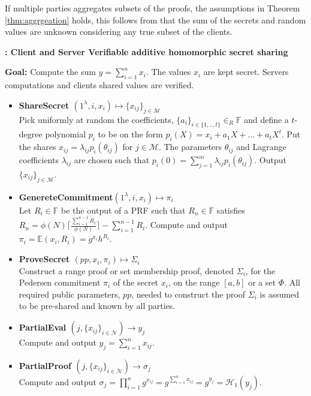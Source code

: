 If multiple parties aggregates subsets of the proofs, the assumptions in Theorem \ref{thm:aggrgeation} holds,  this follows from that the sum of the secrets and random values are unknown considering any true subset of the clients. 

\begin{algorithm}
\caption{\textbf{: Client and Server Verifiable additive homomorphic secret sharing}}

\textbf{Goal:} Compute the sum $y = \sum_{i=1}^n x_i$. The values $x_i$ are kept secret. Servers computations and clients shared values are verified. 
\vspace{2pt}
\hline
\vspace{2pt}
\begin{itemize}
 \item\textbf{ShareSecret $(1^\lambda,i,x_i) \mapsto \{x_{ij}\}_{j\in\mathcal{M}}$} \\
Pick uniformly at random the coefficients, $\{a_i\}_{i\in\{1,..,t\}}\in_R\mathds{F}$ and define a $t$-degree polynomial $p_i$ to be on the form $p_i(X) = x_i + a_1X+...+a_tX^t$. Put the shares $x_{ij}=\lambda_{ij}p_i(\theta_{ij})$ for $j\in\mathcal{M}$.  The parameters $\theta_{ij}$ and Lagrange coefficients $\lambda_{ij}$ are chosen such that $ p_i(0) = \sum_{j=1}^m \lambda_{ij}p_i(\theta_{ij})$.
Output $\{x_{ij}\}_{j\in\mathcal{M}}$.

\item\textbf{GenereteCommitment$(1^\lambda,i,x_i) \mapsto \pi_i$ }\\
Let $R_i\in\mathds{F}$ be the output of a PRF such that $R_n\in \mathds{F}$  satisfies $R_n = \phi(N)\lceil \frac{\sum_{i=1}^{n-1}R_i}{\phi(N)}\rceil- \sum_{i=1}^{n-1}R_i $. Compute and output $\pi_i = \mathds{E}(x_i,R_i)= g^{x_i}h^{R_i}$.

\item\textbf{ProveSecret $(pp,x_i,\pi_i) \mapsto \Sigma_i$}\\
Construct a range proof or set membership proof, denoted $\Sigma_i$, for the Pedersen commitment $\pi_i$ of the secret $x_i$, on the  range $[a,b]$ or a set $\Phi$. All required public parameters, $pp$, needed to  construct the proof $\Sigma_i$ is assumed to be pre-shared and known by all parties.
\item\textbf{PartialEval $(j,\{x_{ij}\}_{i\in\mathcal{N}})\xrightarrow[]{}y_j$}\\
Compute and output $y_j = \sum_{i=1}^n x_{ij}$.

\item\textbf{PartialProof $(j,\{x_{ij}\}_{i\in\mathcal{N}})\xrightarrow[]{}\sigma_j$}\\
Compute and output $\sigma_j = \prod_{i=1}^n g^{x_{ij}} =  g^{\sum_{i=1}^n x_{ij}}= g^{y_j}=\mathcal{H}_1(y_j)$.


\end{itemize}
\end{algorithm}
